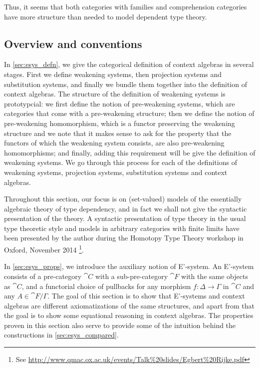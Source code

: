 Thus, it seems that both categories with families and comprehension categories
have more structure than needed to model dependent type theory.

\subsection*{Overview and conventions}
In \autoref{sec:esys_defn}, we give the categorical definition of context algebras in 
several stages. First we define weakening systems, then projection systems and
substitution systems, and finally we bundle them together into the definition
of context algebras. The structure of the definition of weakening systems is 
prototypcial: we first define the notion of pre-weakening systems, which are
categories that come with a pre-weakening structure; then we define the notion
of pre-weakening homomorphism, which is a functor preserving the weakening
structure and we note that it makes sense to ask for the property that the
functors of which the weakening system consists, are also pre-weakening
homomorphisms; and finally, adding this requirement will be give the definition
of weakening systems. We go through this process for each of the definitions
of weakening systems, projection systems, substitution systems and context algebras.

Throughout this section, our focus is on (set-valued) models of the essentially algebraic
theory of type dependency, and in fact we shall not give the syntactic
presentation of the theory. A syntactic presentation of type theory in the
usual type theoretic style and models in arbitrary categories with finite limits
have been presented by the author during the Homotopy Type Theory workshop in
Oxford, November 2014%
\footnote{See \url{http://www.qmac.ox.ac.uk/events/Talk\%20slides/Egbert\%20Rijke.pdf}}.

In \autoref{sec:esys_props}, we introduce the auxiliary notion of E'-system.
An E'-system consists of a pre-category $\cat{C}$ with a sub-pre-category
$\cat{F}$ with the same objects as $\cat{C}$, and a functorial choice of
pullbacks for any morphism $f:\Delta\to\Gamma$ in $\cat{C}$ and any
$A\in\cat{F}/\Gamma$. The goal of this section is to show that 
E'-systems and context algebras are different axiomatizations of the same structures,
and apart from that the goal is to show some equational reasoning in context algebras.
The properties proven in this section also serve to provide some of the 
intuition behind the constructions in \autoref{sec:esys_compared}.

